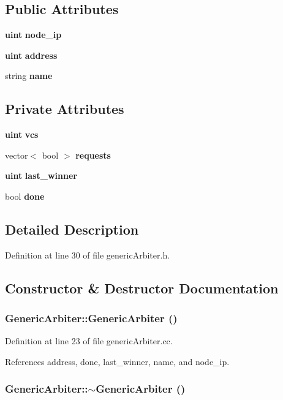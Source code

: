 \subsection*{Public Attributes}
\begin{CompactItemize}
\item 
{\bf uint} {\bf node\_\-ip}
\item 
{\bf uint} {\bf address}
\item 
string {\bf name}
\end{CompactItemize}
\subsection*{Private Attributes}
\begin{CompactItemize}
\item 
{\bf uint} {\bf vcs}
\item 
vector$<$ bool $>$ {\bf requests}
\item 
{\bf uint} {\bf last\_\-winner}
\item 
bool {\bf done}
\end{CompactItemize}


\subsection{Detailed Description}


Definition at line 30 of file genericArbiter.h.

\subsection{Constructor \& Destructor Documentation}
\subsubsection[{GenericArbiter}]{\setlength{\rightskip}{0pt plus 5cm}GenericArbiter::GenericArbiter ()}\label{classGenericArbiter_f268b17257b6084b8faa82e4539580f5}




Definition at line 23 of file genericArbiter.cc.

References address, done, last\_\-winner, name, and node\_\-ip.
\subsubsection[{$\sim$GenericArbiter}]{\setlength{\rightskip}{0pt plus 5cm}GenericArbiter::$\sim$GenericArbiter ()}\label{classGenericArbiter_c8e72db9c3fb2c9b406933a104592519}




